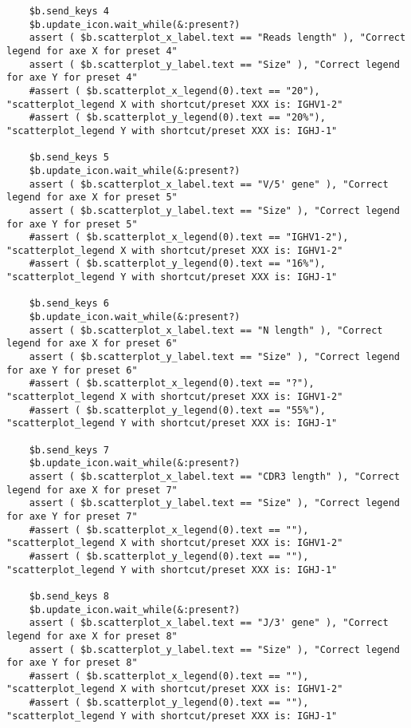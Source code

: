 \begin{verbatim}
    $b.send_keys 4
    $b.update_icon.wait_while(&:present?)
    assert ( $b.scatterplot_x_label.text == "Reads length" ), "Correct legend for axe X for preset 4"
    assert ( $b.scatterplot_y_label.text == "Size" ), "Correct legend for axe Y for preset 4"
    #assert ( $b.scatterplot_x_legend(0).text == "20"), "scatterplot_legend X with shortcut/preset XXX is: IGHV1-2"
    #assert ( $b.scatterplot_y_legend(0).text == "20%"), "scatterplot_legend Y with shortcut/preset XXX is: IGHJ-1"

    $b.send_keys 5
    $b.update_icon.wait_while(&:present?)
    assert ( $b.scatterplot_x_label.text == "V/5' gene" ), "Correct legend for axe X for preset 5"
    assert ( $b.scatterplot_y_label.text == "Size" ), "Correct legend for axe Y for preset 5"
    #assert ( $b.scatterplot_x_legend(0).text == "IGHV1-2"), "scatterplot_legend X with shortcut/preset XXX is: IGHV1-2"
    #assert ( $b.scatterplot_y_legend(0).text == "16%"), "scatterplot_legend Y with shortcut/preset XXX is: IGHJ-1"

    $b.send_keys 6
    $b.update_icon.wait_while(&:present?)
    assert ( $b.scatterplot_x_label.text == "N length" ), "Correct legend for axe X for preset 6"
    assert ( $b.scatterplot_y_label.text == "Size" ), "Correct legend for axe Y for preset 6"
    #assert ( $b.scatterplot_x_legend(0).text == "?"), "scatterplot_legend X with shortcut/preset XXX is: IGHV1-2"
    #assert ( $b.scatterplot_y_legend(0).text == "55%"), "scatterplot_legend Y with shortcut/preset XXX is: IGHJ-1"

    $b.send_keys 7
    $b.update_icon.wait_while(&:present?)
    assert ( $b.scatterplot_x_label.text == "CDR3 length" ), "Correct legend for axe X for preset 7"
    assert ( $b.scatterplot_y_label.text == "Size" ), "Correct legend for axe Y for preset 7"
    #assert ( $b.scatterplot_x_legend(0).text == ""), "scatterplot_legend X with shortcut/preset XXX is: IGHV1-2"
    #assert ( $b.scatterplot_y_legend(0).text == ""), "scatterplot_legend Y with shortcut/preset XXX is: IGHJ-1"

    $b.send_keys 8
    $b.update_icon.wait_while(&:present?)
    assert ( $b.scatterplot_x_label.text == "J/3' gene" ), "Correct legend for axe X for preset 8"
    assert ( $b.scatterplot_y_label.text == "Size" ), "Correct legend for axe Y for preset 8"
    #assert ( $b.scatterplot_x_legend(0).text == ""), "scatterplot_legend X with shortcut/preset XXX is: IGHV1-2"
    #assert ( $b.scatterplot_y_legend(0).text == ""), "scatterplot_legend Y with shortcut/preset XXX is: IGHJ-1"


\end{verbatim}
